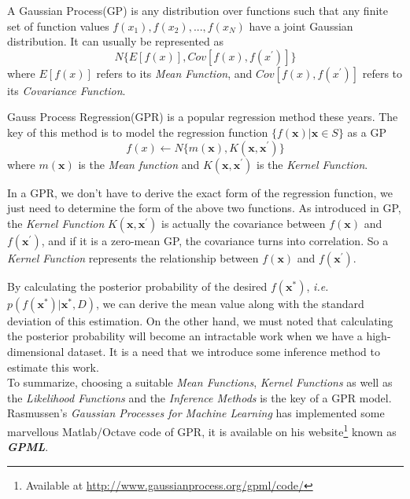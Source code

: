 A Gaussian Process(GP) is any distribution over functions such that any finite set of function values $f(x_1), f(x_2), ..., f(x_N)$ have a joint Gaussian distribution\cite{rasmussen2006gaussian}. It can usually be represented as
\begin{equation}
N\{ E[ f(x) ], Cov[f(x), f(x^{'})] \}
\end{equation}
where $E[ f(x) ]$ refers to its \emph{Mean Function}, and $Cov[f(x), f(x^{'})]$ refers to its \emph{Covariance Function}.

Gauss Process Regression(GPR)\cite{rasmussen2006gaussian} is a popular regression method these years.
The key of this method is to model the regression function $\{ f(\textbf{x}) | \textbf{x} \in S\}$ as a GP 
\begin{equation}
f(x) \gets N \{ m(\textbf{x}), K (\textbf{x},\textbf{x}^{'}) \}
\end{equation}
where $m(\textbf{x})$ is the \emph{Mean function} and $K (\textbf{x},\textbf{x}^{'})$ is the \emph{Kernel Function}.

In a GPR, we don't have to derive the exact form of the regression function, we just need to determine the form of the above two functions. 
As introduced in GP, the \emph{Kernel Function} $K (\textbf{x},\textbf{x}^{'})$ is actually the covariance between $f(\textbf{x})$ and $f(\textbf{x}^{'})$, and if it is a zero-mean GP, the covariance turns into correlation. So a \emph{Kernel Function} represents the relationship between $f(\textbf{x})$ and $f(\textbf{x}^{'})$.

By calculating the posterior probability of the desired $f(\textbf{x}^{*})$, \emph{i.e.} $p(f(\textbf{x}^{*}) | \textbf{x}^{*}, D)$, we can derive the mean value along with the standard deviation of this estimation. 
On the other hand, we must noted that calculating the posterior probability will become an intractable work when we have a high-dimensional dataset. It is a need that we introduce some inference method to estimate this work. \\

To summarize, choosing a suitable \emph{Mean Functions}, \emph{Kernel Functions} as well as the \emph{Likelihood Functions} and the \emph{Inference Methods} is the key of a GPR model.
Rasmussen's \emph{Gaussian Processes for Machine Learning}\cite{rasmussen2006gaussian} has implemented some marvellous Matlab/Octave code of GPR, it is available on his website\footnote{Available at \color{blue}\href{http://www.gaussianprocess.org/gpml/code/matlab/doc/}{http://www.gaussianprocess.org/gpml/code/}} known as \textbf{\emph{GPML}}.


